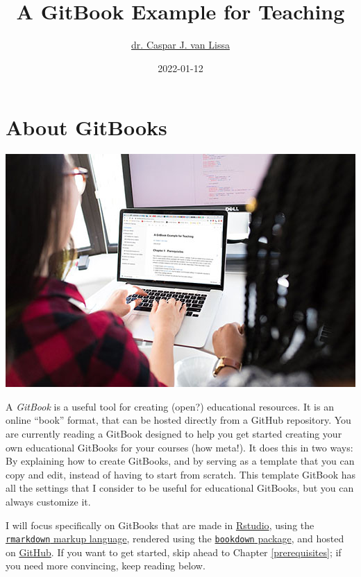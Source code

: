 \documentclass[
]{book}
\title{A GitBook Example for Teaching}
\author{\href{https://www.uu.nl/staff/CJvanLissa}{dr. Caspar J. van Lissa}}
\date{2022-01-12}
\begin{document}
\maketitle

{
\setcounter{tocdepth}{1}
\tableofcontents
}
\hypertarget{about-gitbooks}{%
\chapter{About GitBooks}\label{about-gitbooks}}

\includegraphics{./img/using_gitbook.jpeg}

A \emph{GitBook} is a useful tool for creating (open?) educational resources. It is an online ``book'' format, that can be hosted directly from a GitHub repository. You are currently reading a GitBook designed to help you get started creating your own educational GitBooks for your courses (how meta!). It does this in two ways: By explaining how to create GitBooks, and by serving as a template that you can copy and edit, instead of having to start from scratch. This template GitBook has all the settings that I consider to be useful for educational GitBooks, but you can always customize it.

I will focus specifically on GitBooks that are made in \href{https://rstudio.com}{Rstudio}, using the \href{https://rstudio.com/wp-content/uploads/2016/03/rmarkdown-cheatsheet-2.0.pdf}{\texttt{rmarkdown} markup language}, rendered using the \href{https://bookdown.org/yihui/bookdown/get-started.html}{\texttt{bookdown} package}, and hosted on \href{https://github.com/}{GitHub}. If you want to get started, skip ahead to Chapter \ref{prerequisites}; if you need more convincing, keep reading below.
\end{document}
